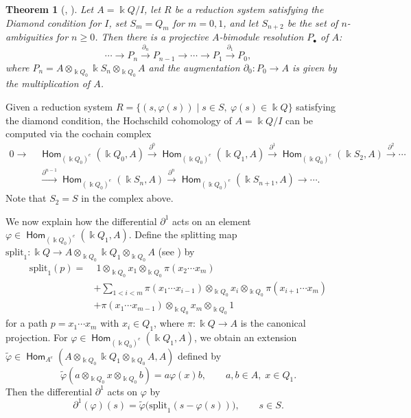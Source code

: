\documentclass[a4paper, reqno, 11pt]{amsart}
\newtheorem{theorem}{Theorem}[section]
\theoremstyle{definition}
\newcommand{\opname}[1]{\operatorname{\mathsf{#1}}}
\newcommand{\Hom}{\opname{Hom}}
\begin{document}
	\begin{theorem}[{\cite[Section 4]{Chouhy-Solotar2015}, \cite[Theorem 4.2]{Barmeier-Wang2020}}]
		\label{theorem:projective}
		Let $A = \Bbbk Q / I$, let $R$ be a reduction system satisfying the Diamond condition for $I$, set $S_m = Q_m$ for $m = 0, 1$, and let $S_{n+2}$ be the set of $n$-ambiguities for $n \geq 0$. Then there is a projective $A$-bimodule resolution $P_{\bullet}$ of $A$:
		\[
		\cdots \longrightarrow P_n \xrightarrow{\partial_n} P_{n-1} \longrightarrow \cdots \longrightarrow P_1 \xrightarrow{\partial_1} P_0,
		\]
		where $P_n = A \otimes_{\Bbbk Q_0} \Bbbk S_n \otimes_{\Bbbk Q_0} A$ and the augmentation $\partial_0: P_0 \to A$ is given by the multiplication of $A$.
	\end{theorem}
	Given a reduction system $R = \{ (s, \varphi(s)) \mid s \in S,\ \varphi(s) \in \Bbbk Q \}$ satisfying the diamond condition, the Hochschild cohomology of $A = \Bbbk Q/I$ can be computed via the cochain complex
	\begin{equation}\label{eq:CS-complex}
		\begin{aligned}
			0 \to\;&
			\Hom_{(\Bbbk Q_0)^e}(\Bbbk Q_0, A)
			\xrightarrow{\partial^0}
			\Hom_{(\Bbbk Q_0)^e}(\Bbbk Q_1, A)
			\xrightarrow{\partial^1}
			\Hom_{(\Bbbk Q_0)^e}(\Bbbk S_2, A)
			\xrightarrow{\partial^2} \cdots \\
			&\xrightarrow{\partial^{n-1}}
			\Hom_{(\Bbbk Q_0)^e}(\Bbbk S_n, A)
			\xrightarrow{\partial^n}
			\Hom_{(\Bbbk Q_0)^e}(\Bbbk S_{n+1}, A)
			\to \cdots .
		\end{aligned}
	\end{equation}
	Note that $S_2=S$ in the complex above.
	
	We now explain how the differential $\partial^1$ acts on an element $\varphi \in \Hom_{(\Bbbk Q_0)^e}(\Bbbk Q_1, A)$.  
	Define the splitting map $\mathrm{split}_1: \Bbbk Q \to A \otimes_{\Bbbk Q_0} \Bbbk Q_1 \otimes_{\Bbbk Q_0} A$ (see \cite[Lemma 4.6]{Barmeier-Wang2020}) by
	\begin{align*}
		\mathrm{split}_1(p) = & \; 1 \otimes_{\Bbbk Q_0} x_1 \otimes_{\Bbbk Q_0} \pi(x_2 \cdots x_m) \\
		& + \sum\limits_{1 < i < m} \pi(x_1 \cdots x_{i-1}) \otimes_{\Bbbk Q_0} x_i \otimes_{\Bbbk Q_0} \pi(x_{i+1} \cdots x_m) \\
		& + \pi(x_1 \cdots x_{m-1}) \otimes_{\Bbbk Q_0} x_m \otimes_{\Bbbk Q_0} 1
	\end{align*}
	for a path $p = x_1 \cdots x_m$ with $x_i \in Q_1$, where $\pi: \Bbbk Q \to A$ is the canonical projection.  
	For $\varphi \in \Hom_{(\Bbbk Q_0)^e}(\Bbbk Q_1, A)$, we obtain an extension $\widetilde{\varphi} \in \Hom_{A^e}(A \otimes_{\Bbbk Q_0} \Bbbk Q_1 \otimes_{\Bbbk Q_0} A, A)$ defined by
	\[
	\widetilde{\varphi}(a \otimes_{\Bbbk Q_0} x \otimes_{\Bbbk Q_0} b) = a\varphi(x)b, \qquad a,b \in A,\; x \in Q_1.
	\]
	Then the differential $\partial^1$ acts on $\varphi$ by
	\begin{equation}
		\partial^1(\varphi)(s) = \widetilde{\varphi}\bigl(\mathrm{split}_1(s - \varphi(s))\bigr), \qquad s \in S.
		\label{eq:partial1}
	\end{equation}
	
\end{document}
